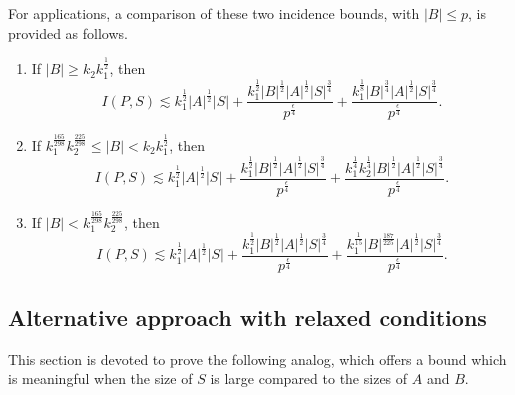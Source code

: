 \documentclass[11pt]{article}
\def\lv{\left\vert}
\def\rv{\right\vert}
\begin{document}
For applications, a comparison of these two incidence bounds, with $|B|\le p$, is provided as follows. 
\begin{enumerate}
    \item If $|B|\ge k_2k_1^{\frac{1}{2}}$, then
\[ I(P,S) \lesssim  k_1^{\frac{1}{2}}|A|^{\frac{1}{2}}|S|+  \frac{k_1^{\frac{1}{2}}\lv B\rv^{\frac{1}{2}}|A|^{\frac{1}{2}}|S|^{\frac{3}{4}}}{p^{\frac{\epsilon}{4}}}+ \frac{k_1^{\frac{1}{8}}\lv B\rv^{\frac{3}{4}}|A|^{\frac{1}{2}} |S|^{\frac{3}{4}}}{p^{\frac{\epsilon}{4}}}. \]
\item If $k_1^{\frac{165}{298}}k_2^{\frac{225}{298}} \le |B|< k_2k_1^{\frac{1}{2}}$, then
\[ I(P,S) \lesssim  k_1^{\frac{1}{2}}|A|^{\frac{1}{2}}|S|+  \frac{k_1^{\frac{1}{2}}\lv B\rv^{\frac{1}{2}}|A|^{\frac{1}{2}}|S|^{\frac{3}{4}}}{p^{\frac{\epsilon}{4}}}+ \frac{k_1^{\frac{1}{4}}k_2^{\frac{1}{4}}\lv B\rv^{\frac{1}{2}} |A|^{\frac{1}{2}}|S|^{\frac{3}{4}}}{p^{\frac{\epsilon}{4}}}. \]
\item If $|B| <k_1^{\frac{165}{298}}k_2^{\frac{225}{298}} $, then
\[ I(P,S) \lesssim  k_1^{\frac{1}{2}}|A|^{\frac{1}{2}}|S|+  \frac{k_1^{\frac{1}{2}}\lv B\rv^{\frac{1}{2}}|A|^{\frac{1}{2}}|S|^{\frac{3}{4}}}{p^{\frac{\epsilon}{4}}}+\frac{k_1^{\frac{1}{15}}|B|^{\frac{187}{225}} |A|^{\frac{1}{2}} |S|^{\frac{3}{4}}}{p^{\frac{\epsilon}{4}}}.\]
\end{enumerate}

\subsection{Alternative approach with relaxed conditions}
This section is devoted to prove the following analog, which offers a bound which is meaningful when the size of $S$ is large compared to the sizes of $A$ and $B$.
\end{document}
